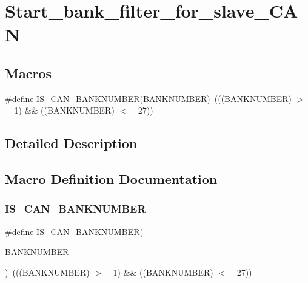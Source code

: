\hypertarget{group___start__bank__filter__for__slave___c_a_n}{}\section{Start\+\_\+bank\+\_\+filter\+\_\+for\+\_\+slave\+\_\+\+C\+AN}
\label{group___start__bank__filter__for__slave___c_a_n}
\subsection*{Macros}
\begin{DoxyCompactItemize}
\item 
\#define \mbox{\hyperlink{group___start__bank__filter__for__slave___c_a_n_ga7fb463088ff4cd584bba47e3d0a4f469}{I\+S\+\_\+\+C\+A\+N\+\_\+\+B\+A\+N\+K\+N\+U\+M\+B\+ER}}(B\+A\+N\+K\+N\+U\+M\+B\+ER)~(((B\+A\+N\+K\+N\+U\+M\+B\+ER) $>$= 1) \&\& ((B\+A\+N\+K\+N\+U\+M\+B\+ER) $<$= 27))
\end{DoxyCompactItemize}


\subsection{Detailed Description}


\subsection{Macro Definition Documentation}
\mbox{\label{group___start__bank__filter__for__slave___c_a_n_ga7fb463088ff4cd584bba47e3d0a4f469}} 
\subsubsection{\texorpdfstring{IS\_CAN\_BANKNUMBER}{IS\_CAN\_BANKNUMBER}}
{\footnotesize\ttfamily \#define I\+S\+\_\+\+C\+A\+N\+\_\+\+B\+A\+N\+K\+N\+U\+M\+B\+ER(\begin{DoxyParamCaption}\item[{}]{B\+A\+N\+K\+N\+U\+M\+B\+ER }\end{DoxyParamCaption})~(((B\+A\+N\+K\+N\+U\+M\+B\+ER) $>$= 1) \&\& ((B\+A\+N\+K\+N\+U\+M\+B\+ER) $<$= 27))}

